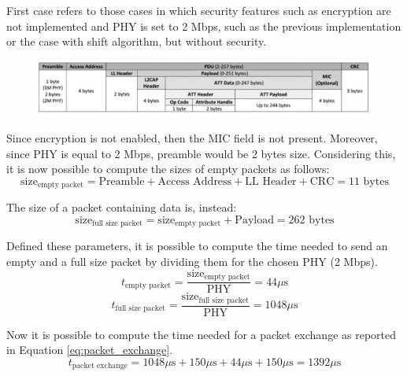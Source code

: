 \documentclass{Configuration_Files/PoliMi3i_thesis}
\begin{document}
First case refers to those cases in which security features such as encryption are not implemented and PHY is set to 2 Mbps, such as the previous implementation or the case with shift algorithm, but without security.

\begin{figure}[h]
    \centering
    \includegraphics[scale=0.3]{theoretical_throughput.png}
\end{figure}

Since encryption is not enabled, then the MIC field is not present. Moreover, since PHY is equal to 2 Mbps, preamble would be 2 bytes size. Considering this, it is now possible to compute the sizes of empty packets as follows:
\begin{equation}
\text{size}_{\text{empty packet}} = \text{Preamble} + \text{Access Address} + \text{LL Header} + \text{CRC} = 11 \text{ bytes}
\label{eq:size_empty_packet}
\end{equation}

The size of a packet containing data is, instead:
\begin{equation}
\text{size}_{\text{full size packet}} = \text{size}_{\text{empty packet}} + \text{Payload} = 262 \text{ bytes}
\label{eq:size_full_size_packet}
\end{equation}

Defined these parameters, it is possible to compute the time needed to send an empty and a full size packet by dividing them for the chosen PHY (2 Mbps).
\begin{equation}
t_{\text{empty packet}} = \frac{\text{size}_{\text{empty packet}}}{\text{PHY}} = 44 \mu \text{s}
\label{eq:t_empty_packet}
\end{equation}
\begin{equation}
t_{\text{full size packet}} = \frac{\text{size}_{\text{full size packet}}}{\text{PHY}} = 1048 \mu \text{s}
\label{eq:t_full_size_packet}
\end{equation}

Now it is possible to compute the time needed for a packet exchange as reported in Equation \ref{eq:packet_exchange}.
\begin{equation}
t_{\text{packet exchange}} = 1048 \mu \text{s} + 150 \mu \text{s} + 44 \mu \text{s} + 150 \mu \text{s} = 1392 \mu \text{s}
\label{eq:packet_exchange_case1}
\end{equation}
\end{document}
